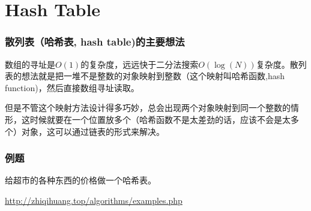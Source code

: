 \documentclass[CJK,14pt]{beamer}
\begin{document}
  \section{Hash Table}
  
  \begin{frame}
    \frametitle{散列表（哈希表, hash table)的主要想法}
      数组的寻址是$O(1)$的复杂度，远远快于二分法搜索$O(\log(N))$复杂度。散列表的想法就是把一堆不是整数的对象映射到整数（这个映射叫哈希函数,hash function)，然后直接数组寻址读取。

        \skipline
        
      但是不管这个映射方法设计得多巧妙，总会出现两个对象映射到同一个整数的情形，这时候就要在一个位置放多个（哈希函数不是太差劲的话，应该不会是太多个）对象，这可以通过链表的形式来解决。
  \end{frame}

  \begin{frame}
    \frametitle{例题}
    给超市的各种东西的价格做一个哈希表。

    \url{http://zhiqihuang.top/algorithms/examples.php}    
  \end{frame}
  
\ech
\end{document}

